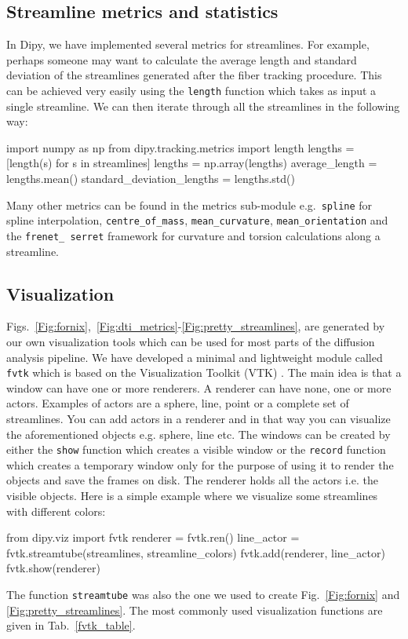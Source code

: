 \documentclass{bioinfo}
\begin{document}
\subsection{Streamline metrics and statistics}

In Dipy, we have implemented several metrics for streamlines. For example,
perhaps someone may want to calculate the
average length and standard deviation of the streamlines generated after the
fiber tracking procedure. This can be achieved very easily using the \texttt{length}
function which takes as input a single streamline. We can then iterate through
all the streamlines in the following way:
\begin{python}
import numpy as np
from dipy.tracking.metrics import length
lengths = [length(s) for s in streamlines]
lengths = np.array(lengths)
average_length = lengths.mean()
standard_deviation_lengths = lengths.std()
\end{python}
Many other metrics can be found in the metrics sub-module e.g.~\texttt{spline} for
spline interpolation, \texttt{centre\_of\_mass}, \texttt{mean\_curvature}, \texttt{mean\_orientation} and the \texttt{frenet\_ serret} framework for curvature
and torsion calculations along a streamline.

\subsection{Visualization}
Figs.~\ref{Fig:fornix},~\ref{Fig:dti_metrics}-\ref{Fig:pretty_streamlines},
are generated by
our own visualization tools which can be used for most parts of the diffusion
analysis pipeline. We have developed a minimal and lightweight module called
\texttt{fvtk} which is based on the Visualization Toolkit (VTK)
\citep{schroeder:01}. The main idea is that a window can have one or more
renderers.
A renderer can have none, one or more actors. Examples of actors are a sphere,
line, point or a complete set of streamlines. You can add actors in a
renderer and in that way you can visualize the aforementioned objects e.g.
sphere, line etc. The windows can
be created by either the \texttt{show} function which creates a visible window
or the \texttt{record} function which creates a temporary window only for the
purpose of using it to render the objects and save the frames on disk. The
renderer holds all the actors i.e. the visible objects. Here is a simple example
where we visualize some streamlines with different colors:
\begin{python}
from dipy.viz import fvtk
renderer = fvtk.ren()
line_actor = fvtk.streamtube(streamlines,
                             streamline_colors)
fvtk.add(renderer, line_actor)
fvtk.show(renderer)
\end{python}
The function \texttt{streamtube} was also the one we used to create Fig.~\ref{Fig:fornix} and \ref{Fig:pretty_streamlines}.
The most commonly used visualization functions are given in Tab.~\ref{fvtk_table}.
\end{document}
